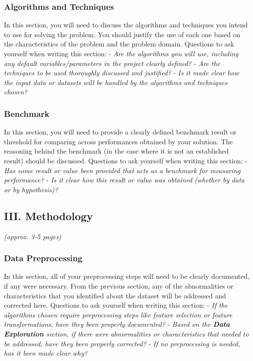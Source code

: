 \documentclass[
]{article}
\begin{document}
\hypertarget{algorithms-and-techniques}{%
\subsubsection{Algorithms and
Techniques}\label{algorithms-and-techniques}}

In this section, you will need to discuss the algorithms and techniques
you intend to use for solving the problem. You should justify the use of
each one based on the characteristics of the problem and the problem
domain. Questions to ask yourself when writing this section: - \emph{Are
the algorithms you will use, including any default variables/parameters
in the project clearly defined?} - \emph{Are the techniques to be used
thoroughly discussed and justified?} - \emph{Is it made clear how the
input data or datasets will be handled by the algorithms and techniques
chosen?}

\hypertarget{benchmark}{%
\subsubsection{Benchmark}\label{benchmark}}

In this section, you will need to provide a clearly defined benchmark
result or threshold for comparing across performances obtained by your
solution. The reasoning behind the benchmark (in the case where it is
not an established result) should be discussed. Questions to ask
yourself when writing this section: - \emph{Has some result or value
been provided that acts as a benchmark for measuring performance?} -
\emph{Is it clear how this result or value was obtained (whether by data
or by hypothesis)?}

\hypertarget{iii.-methodology}{%
\subsection{III. Methodology}\label{iii.-methodology}}

\emph{(approx. 3-5 pages)}

\hypertarget{data-preprocessing}{%
\subsubsection{Data Preprocessing}\label{data-preprocessing}}

In this section, all of your preprocessing steps will need to be clearly
documented, if any were necessary. From the previous section, any of the
abnormalities or characteristics that you identified about the dataset
will be addressed and corrected here. Questions to ask yourself when
writing this section: - \emph{If the algorithms chosen require
preprocessing steps like feature selection or feature transformations,
have they been properly documented?} - \emph{Based on the \textbf{Data
Exploration} section, if there were abnormalities or characteristics
that needed to be addressed, have they been properly corrected?} -
\emph{If no preprocessing is needed, has it been made clear why?}
\end{document}
